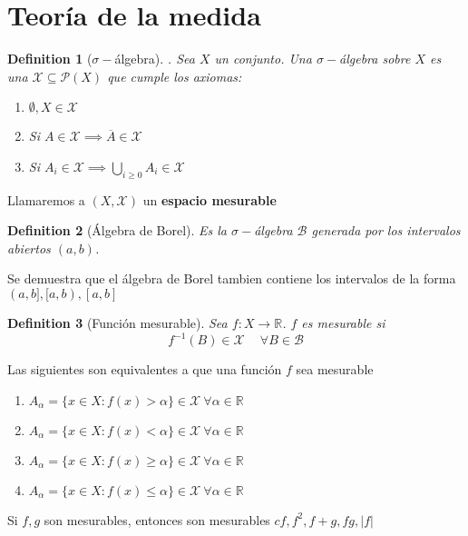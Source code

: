 \documentclass{myclass}
\newtheorem*{definition}{Definition}
\begin{document}
\section{Teoría de la medida}
\begin{definition}[$\sigma -$álgebra]. Sea $X$ un conjunto. Una  $\sigma -$álgebra sobre $X$ es una  $\mathcal{X} \subseteq \mathcal{P}(X)$ que cumple los axiomas:
  \begin{enumerate}[topsep=-6pt, itemsep=0pt]
    \item $\emptyset, X \in \mathcal{X}$
	\item Si $A\in \mathcal{X} \implies \overline{A}\in \mathcal{X}$ 
	\item Si $A_i \in \mathcal{X} \implies \bigcup_{i\ge 0}A_i \in \mathcal{X}$
  \end{enumerate}
\end{definition}

Llamaremos a $(X, \mathcal{X})$ un \textbf{espacio mesurable}

\begin{definition}[Álgebra de Borel] Es la $\sigma -$álgebra $\mathcal{B}$ generada por los intervalos abiertos $(a,b)$.
\end{definition}

Se demuestra que el álgebra de Borel tambien contiene los intervalos de la forma $(a, b], [a, b), [a, b]$

\begin{definition}[Función mesurable] Sea $f:X \to \mathbb{R}$. $f$ es mesurable si
   \[
 f^{-1}(B)\in \mathcal{X} \quad \ \forall B \in \mathcal{B}
  \] 
\end{definition}

Las siguientes son equivalentes a que una función $f$ sea mesurable
\begin{enumerate}[topsep=-6pt, itemsep=0pt]
  \item $A_{\alpha} = \{x \in X : f(x)>\alpha \}\in \mathcal{X} \ \forall \alpha \in \mathbb{R}$
  \item $A_{\alpha} = \{x \in X : f(x)<\alpha \}\in \mathcal{X} \ \forall \alpha \in \mathbb{R}$
  \item $A_{\alpha} = \{x \in X : f(x) \ge \alpha \}\in \mathcal{X} \ \forall \alpha \in \mathbb{R}$
  \item $A_{\alpha} = \{x \in X : f(x)\le \alpha \}\in \mathcal{X} \ \forall \alpha \in \mathbb{R}$
\end{enumerate}

Si $f, g$ son mesurables, entonces son mesurables $cf, f^2, f+g, fg, |f|$
\end{document}
